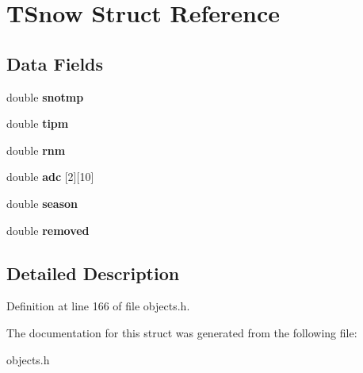 \hypertarget{struct_t_snow}{}\section{T\+Snow Struct Reference}
\label{struct_t_snow}
\subsection*{Data Fields}
\begin{DoxyCompactItemize}
\item 
\mbox{\label{struct_t_snow_a3177d2eed9ac6c90d757cf71d894d643}} 
double {\bfseries snotmp}
\item 
\mbox{\label{struct_t_snow_a7e35c0494d1d32897fb30e76a3570d31}} 
double {\bfseries tipm}
\item 
\mbox{\label{struct_t_snow_a83e0def0910ef7944de69d8d31c2293e}} 
double {\bfseries rnm}
\item 
\mbox{\label{struct_t_snow_ad3d31efcf3fc254a963e4929a001fb28}} 
double {\bfseries adc} \mbox{[}2\mbox{]}\mbox{[}10\mbox{]}
\item 
\mbox{\label{struct_t_snow_a5b7dc6ba8357b76b980f3ce20bde4eb3}} 
double {\bfseries season}
\item 
\mbox{\label{struct_t_snow_aabe9b440a90e8724929f96fcfe50b73b}} 
double {\bfseries removed}
\end{DoxyCompactItemize}


\subsection{Detailed Description}


Definition at line 166 of file objects.\+h.



The documentation for this struct was generated from the following file\+:\begin{DoxyCompactItemize}
\item 
objects.\+h\end{DoxyCompactItemize}
